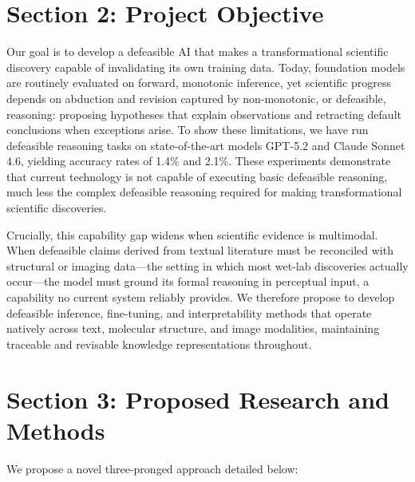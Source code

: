 \documentclass[11pt]{article}
\begin{document}
\section*{Section 2: Project Objective}

Our goal is to develop a defeasible AI that makes a transformational scientific discovery capable of invalidating its own training data. Today, foundation models are routinely evaluated on forward, monotonic inference, yet scientific progress depends on abduction and revision captured by non-monotonic, or defeasible, reasoning: proposing hypotheses that explain observations and retracting default conclusions when exceptions arise. To show these limitations, we have run defeasible reasoning tasks on state-of-the-art models GPT-5.2 and Claude Sonnet 4.6, yielding accuracy rates of 1.4\% and 2.1\%. These experiments demonstrate that current technology is not capable of executing basic defeasible reasoning, much less the complex defeasible reasoning required for making transformational scientific discoveries.

Crucially, this capability gap widens when scientific evidence is multimodal. When defeasible claims derived from textual literature must be reconciled with structural or imaging data---the setting in which most wet-lab discoveries actually occur---the model must ground its formal reasoning in perceptual input, a capability no current system reliably provides. We therefore propose to develop defeasible inference, fine-tuning, and interpretability methods that operate natively across text, molecular structure, and image modalities, maintaining traceable and revisable knowledge representations throughout.

\section*{Section 3: Proposed Research and Methods}

We propose a novel three-pronged approach detailed below:
\end{document}
